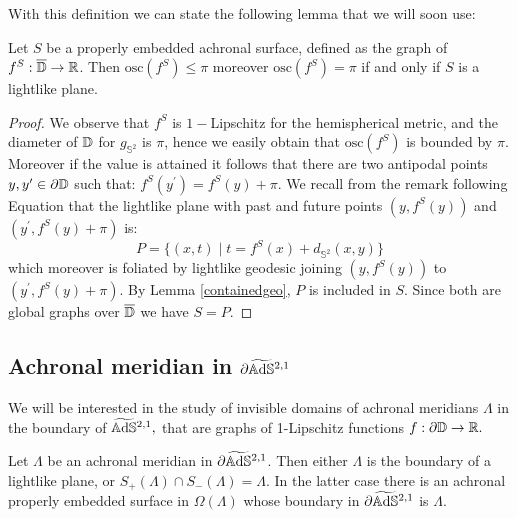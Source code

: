With this definition we can state the following lemma that we will soon use: 

\begin{lemma}\label{417}
    Let $S$ be a properly embedded achronal surface, defined as the graph of $f^S:\overline{\mathbb{D}}\to\mathbb{R}$. Then $\text{osc}(f^S)\leq\pi$ moreover $\text{osc}(f^S)=\pi$ if and only if $S$ is a lightlike plane. 
\end{lemma}
\begin{proof}
    We observe that $f^S$ is $1-$Lipschitz for the hemispherical metric, and the diameter of $\mathbb{D}$ for $g_{\mathbb{S}^2}$ is $\pi$, hence we easily obtain that $\text{osc}(f^S)$ is bounded by $\pi$. Moreover if the value is attained it follows that there are two antipodal points $y,y^{\prime} \in \partial\mathbb{D}$ such that: $f^S(y^{\prime})=f^S(y)+\pi$. We recall from the remark following Equation  that the lightlike plane with past and future points $(y,f^S(y))$ and $(y^{\prime},f^S(y)+\pi)$ is: 
    \[
        P=\{(x,t)\;|\;t=f^S(x)+d_{\mathbb{S}^2}(x,y)\}
    \]
    which moreover is foliated by lightlike geodesic joining $(y,f^S(y))$ to $(y^{\prime},f^S(y)+\pi)$. By Lemma \ref{containedgeo}, $P$ is included in $S$. Since both are global graphs over $\overline{\mathbb{D}}$ we have $S=P$.
\end{proof}

\subsection{Achronal meridian in $\partial\widetilde{\mathbb{A}\mathrm{d}\mathbb{S}}{}^{2,1}$}
We will be interested in the study of invisible domains of achronal meridians $\Lambda$ in the boundary of $\widetilde{\mathbb{A}\mathrm{d}\mathbb{S}}{}^{2,1},$ that are graphs of 1-Lipschitz functions $f:\partial\mathbb{D}\to\mathbb{R}.$

\begin{lemma}\label{431}
    Let $\Lambda$ be an achronal meridian in $\partial\widetilde{\mathbb{A}\mathrm{d}\mathbb{S}}{}^{2,1}$. Then either $\Lambda$ is the boundary of a lightlike plane, or $S_+(\Lambda)\cap S_-(\Lambda)=\Lambda.$ In the latter case there is an achronal properly embedded surface in $\Omega(\Lambda)$ whose boundary in $\partial\widetilde{\mathbb{A}\mathrm{d}\mathbb{S}}{}^{2,1}$ is $\Lambda$.  
\end{lemma}

